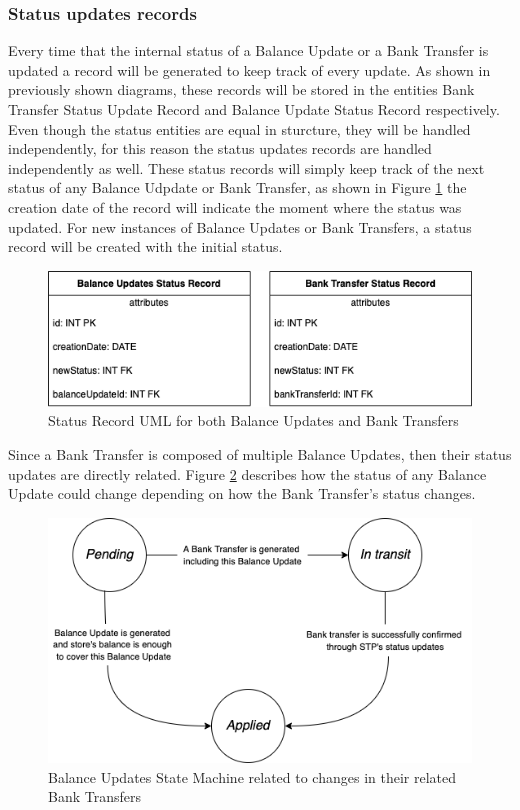 \subsubsection{Status updates records}

Every time that the internal status of a Balance Update or a Bank Transfer is updated a record will be generated to keep track of every update. As shown in previously shown diagrams, these records will be stored in the entities Bank Transfer Status Update Record and Balance Update Status Record respectively. Even though the status entities are equal in sturcture, they will be handled independently, for this reason the status updates records are handled independently as well.
These status records will simply keep track of the next status of any Balance Udpdate or Bank Transfer, as shown in Figure \ref{fig:status_record_uml} the creation date of the record will indicate the moment where the status was updated. For new instances of Balance Updates or Bank Transfers, a status record will be created with the initial status. 

\begin{figure} [H]
    \centering
    \includegraphics[scale = 0.6]{assets/uml/StatusRecordUML.png}
    \caption{Status Record UML for both Balance Updates and Bank Transfers}\label{fig:status_record_uml}
\end{figure}

Since a Bank Transfer is composed of multiple Balance Updates, then their status updates are directly related. Figure \ref{fig:bu_state_machine} describes how the status of any Balance Update could change depending on how the Bank Transfer's status changes. 

\begin{figure} [H]
    \centering
    \includegraphics[scale = 0.6]{assets/diagrams/BUStateMachine.png}
    \caption{Balance Updates State Machine related to changes in their related Bank Transfers}\label{fig:bu_state_machine}
\end{figure}

